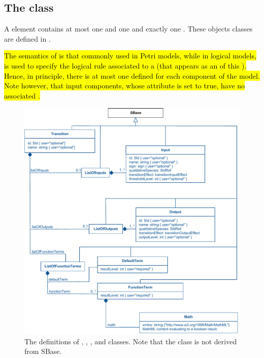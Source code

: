 \pagebreak


\subsection{The  class}
\label{transitions-class}
A \Transition element contains at most one \ListOfInputs and one \ListOfOutputs and exactly one \ListOfFunctionTerms. These objects classes are defined in .

\hl{The semantics of \Transition is that commonly used in Petri models, while in logical models, \Transition is used to specify the logical rule associated to a \QualitativeSpecies (that appears as an \Output of this \Transition). Hence, in principle, there is at most one \Transition defined for each component of the model. Note however, that input components, whose  attribute is set to true, have no associated \Transition. }

\begin{figure}
  \includegraphics{figs/qual-transition-uml.pdf}
  \caption{The definitions of \Transition, \Input, \Output, \DefaultTerm and \FunctionTerm classes. Note that the \DefaultTerm class is not derived from SBase. }
  \label{qual-transition-uml}
\end{figure}

